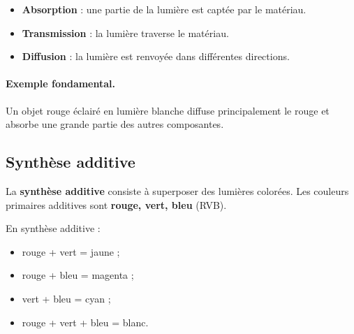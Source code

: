 \documentclass[11pt,a4paper]{article}
\begin{document}
\begin{definitionbox}
\begin{itemize}
    \item \textbf{Absorption} : une partie de la lumière est captée par le matériau.
    \item \textbf{Transmission} : la lumière traverse le matériau.
    \item \textbf{Diffusion} : la lumière est renvoyée dans différentes directions.
\end{itemize}
\end{definitionbox}

\paragraph{Exemple fondamental.}
Un objet rouge éclairé en lumière blanche diffuse principalement le rouge et absorbe une grande partie des autres composantes.

\subsection{Synthèse additive}

\begin{definitionbox}
La \textbf{synthèse additive} consiste à superposer des lumières colorées. Les couleurs primaires additives sont \textbf{rouge, vert, bleu} (RVB).
\end{definitionbox}

\begin{center}
\end{center}

\begin{propriete}
En synthèse additive :
\begin{itemize}
    \item rouge + vert = jaune ;
    \item rouge + bleu = magenta ;
    \item vert + bleu = cyan ;
    \item rouge + vert + bleu = blanc.
\end{itemize}
\end{propriete}
\end{document}
